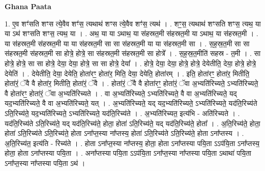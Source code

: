 \documentclass[17pt]{extarticle}
\begin{document}
\textbf{Ghana Paata } \newline

1. ए॒व शꣳ॑सति शꣳस त्ये॒वैव शꣳ॑स॒ त्यथाथ॑ शꣳस त्ये॒वैव शꣳ॑स॒ त्यथ॑ । . शꣳ॒॒स॒ त्यथाथ॑ शꣳसति शꣳस॒ त्यथ॒ या या ऽथ॑ शꣳसति शꣳस॒ त्यथ॒ या । . अथ॒ या या ऽथाथ॒ या स॑हस्रत॒मी स॑हस्रत॒मी या ऽथाथ॒ या स॑हस्रत॒मी । . या स॑हस्रत॒मी स॑हस्रत॒मी या या स॑हस्रत॒मी सा सा स॑हस्रत॒मी या या स॑हस्रत॒मी सा । . स॒ह॒स्र॒त॒मी सा सा स॑हस्रत॒मी स॑हस्रत॒मी सा होत्रे॒ होत्रे॒ सा स॑हस्रत॒मी स॑हस्रत॒मी सा होत्रे᳚ । . स॒ह॒स्र॒त॒मीति॑ सहस्र - त॒मी । . सा होत्रे॒ होत्रे॒ सा सा होत्रे॒ देया॒ देया॒ होत्रे॒ सा सा होत्रे॒ देया᳚ । . होत्रे॒ देया॒ देया॒ होत्रे॒ होत्रे॒ देयेतीति॒ देया॒ होत्रे॒ होत्रे॒ देयेति॑ । . देयेतीति॒ देया॒ देयेति॒ होता॑रꣳ॒॒ होता॑र॒ मिति॒ देया॒ देयेति॒ होता॑रम् । . इति॒ होता॑रꣳ॒॒ होता॑र॒ मितीति॒ होता॑रं॒ ॅवै वै होता॑र॒ मितीति॒ होता॑रं॒ ॅवै । . होता॑रं॒ ॅवै वै होता॑रꣳ॒॒ होता॑रं॒ ॅवा अ॒भ्यति॑रिच्यते॒ ऽभ्यति॑रिच्यते॒ वै होता॑रꣳ॒॒ होता॑रं॒ ॅवा अ॒भ्यति॑रिच्यते । . वा अ॒भ्यति॑रिच्यते॒ ऽभ्यति॑रिच्यते॒ वै वा अ॒भ्यति॑रिच्यते॒ यद् यद॒भ्यति॑रिच्यते॒ वै वा अ॒भ्यति॑रिच्यते॒ यत् । . अ॒भ्यति॑रिच्यते॒ यद् यद॒भ्यति॑रिच्यते॒ ऽभ्यति॑रिच्यते॒ यद॑ति॒रिच्य॑ते ऽति॒रिच्य॑ते॒ यद॒भ्यति॑रिच्यते॒ ऽभ्यति॑रिच्यते॒ यद॑ति॒रिच्य॑ते । . अ॒भ्यति॑रिच्यत॒ इत्य॑भि - अति॑रिच्यते । . यद॑ति॒रिच्य॑ते ऽति॒रिच्य॑ते॒ यद् यद॑ति॒रिच्य॑ते॒ होता॒ होता॑ ऽति॒रिच्य॑ते॒ यद् यद॑ति॒रिच्य॑ते॒ होता᳚ । . अ॒ति॒रिच्य॑ते॒ होता॒ होता॑ ऽति॒रिच्य॑ते ऽति॒रिच्य॑ते॒ होता ऽना᳚प्त॒स्या ना᳚प्तस्य॒ होता॑ ऽति॒रिच्य॑ते ऽति॒रिच्य॑ते॒ होता ऽना᳚प्तस्य । . अ॒ति॒रिच्य॑त॒ इत्य॑ति - रिच्य॑ते । . होता ऽना᳚प्त॒स्या ना᳚प्तस्य॒ होता॒ होता ऽना᳚प्तस्या पयि॒ता ऽऽप॑यि॒ता ऽना᳚प्तस्य॒ होता॒ होता ऽना᳚प्तस्या पयि॒ता । . अना᳚प्तस्या पयि॒ता ऽऽप॑यि॒ता ऽना᳚प्त॒स्या ना᳚प्तस्या पयि॒ता ऽथाथा॑ पयि॒ता ऽना᳚प्त॒स्या ना᳚प्तस्या पयि॒ता ऽथ॑ । \newline
\end{document}
